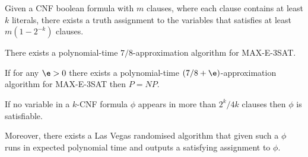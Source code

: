 \documentclass{article}
\begin{document}
\begin{theorem}
  Given a CNF boolean formula with $m$ clauses, where each clause contains at least $k$ literals,
  there exists a truth assignment to the variables that satisfies at least $m(1-2^{-k})$ clauses.
\end{theorem}

\begin{lemma}
  There exists a polynomial-time $7/8$-approximation algorithm for MAX-E-3SAT.
\end{lemma}

\begin{theorem}[Hastad]
  If for any $\e>0$ there exists a polynomial-time $(7/8+\e)$-approximation algorithm for
  MAX-E-3SAT then $P=NP$.
\end{theorem}

\begin{theorem}[Moser]
  If no variable in a $k$-CNF formula $\phi$ appears in more than $2^k/4k$ clauses then
  $\phi$ is satisfiable.

  Moreover, there exists a Las Vegas randomised algorithm that given such a $\phi$ runs in
  expected polynomial time and outputs a satisfying assignment to $\phi$.
\end{theorem}
\end{document}
